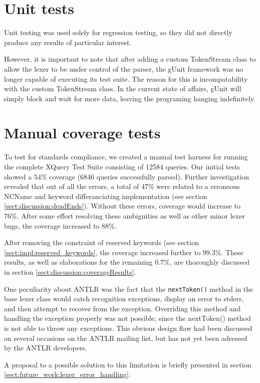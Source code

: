 \label{sect:results:tests}
\section{Unit tests}
Unit testing was used solely for regression testing, so they did not directly 
produce any results of particular interest.

However, it is important to note that after adding a custom TokenStream class to
allow the lexer to be under control of the parser, the gUnit framework was no
longer capable of executing its test suite. The reason for this is
incompatability with the custom TokenStream class. In the current state of
affairs, gUnit will simply block and wait for more data, leaving the programing
hanging indefinitely. 

\section{Manual coverage tests}
\label{sect:tests:manual}
To test for standards compliance, we created a manual test harness for running
the complete XQuery Test Suite\cite{w3c05} consisting of 12584 queries. Our
initial tests showed a 54\% coverage (6846 queries successfully parsed). Further
investigation revealed that out of all the errors, a total of 47\% were related
to a erroneous NCName and keyword differanciating implementation (see section
\ref{sect:discussion:deadEnds}). Without these errors, coverage would increase
to 76\%. After some effort resolving these ambiguities as well as other minor
lexer bugs, the coverage increased to 88\%.

After removing the constraint of reserved keywords (see section
\ref{sect:impl:reserved_keywords}, the coverage increased further to 99.3\%.
These results, as well as elaborations for the remaining 0.7\%, are thoroughly
discussed in section \ref{sect:discussion:coverageResults}.

One peculiarity about ANTLR was the fact that the \verb!nextToken()! method in
the base lexer class would catch recognition exceptions, display an error to stderr, and
then attempt to recover from the exception. Overriding this method and handling
the exception properly was not possible, since the nextToken() method is not
able to throw any exceptions. This obvious design flaw had been discussed on
several occasions on the ANTLR mailing list\cite{antlrmail}, but has not yet
been adressed by the ANTLR developers.

A proposal to a possible solution to this limitation is briefly presented in
section \ref{sect:future_work:lexer_error_handling}.